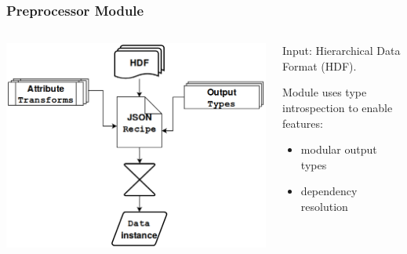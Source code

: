 \documentclass{beamer}
\begin{document}
\renewcommand{\theimage}{\includegraphics[width=1.2\linewidth]{img/reader_flowchart4.png}}%
\begin{frame}\frametitle{Preprocessor Module}
    \begin{columns}
        \begin{column}{.5\textwidth}
            \centerline{\theimage}            
        \end{column}

        \begin{column}{.5\textwidth}
            Input: Hierarchical Data Format (HDF).

            Module uses type introspection to enable features:
            \begin{itemize}
            \item modular output types
            \item dependency resolution
            \end{itemize}

        \end{column}
    \end{columns}
\end{frame}
\end{document}
